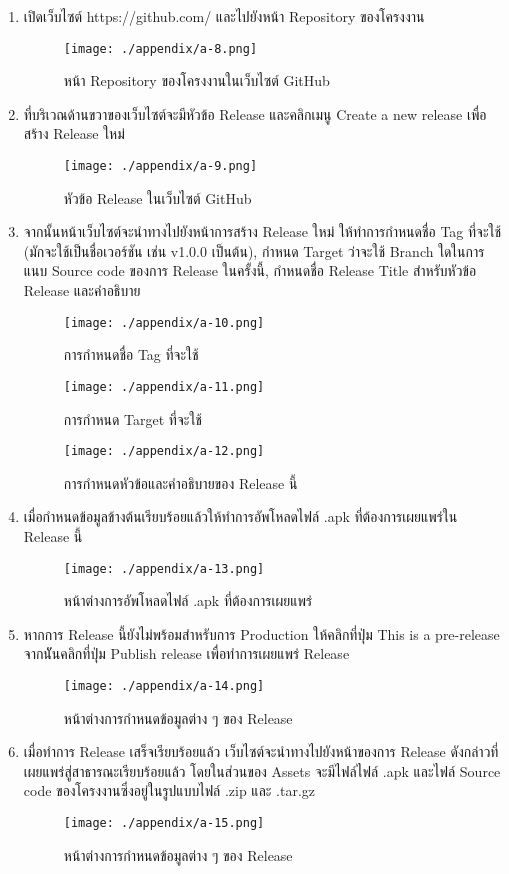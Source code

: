 \begin{enumerate}
    \item เปิดเว็บไซต์ https://github.com/ และไปยังหน้า Repository ของโครงงาน
    \begin{figure}
        \texttt{[image: ./appendix/a-8.png]}
        \caption{หน้า Repository ของโครงงานในเว็บไซต์ GitHub}
    \end{figure}
    \item ที่บริเวณด้านขวาของเว็บไซต์จะมีหัวข้อ Release และคลิกเมนู Create a new release เพื่อสร้าง Release ใหม่
    \begin{figure}
        \texttt{[image: ./appendix/a-9.png]}
        \caption{หัวข้อ Release ในเว็บไซต์ GitHub}
    \end{figure}
    \item จากนั้นหน้าเว็บไซต์จะนำทางไปยังหน้าการสร้าง Release ใหม่ ให้ทำการกำหนดชื่อ Tag ที่จะใช้ (มักจะใช้เป็นชื่อเวอร์ชัน เช่น v1.0.0 เป็นต้น), กำหนด Target ว่าจะใช้ Branch ใดในการแนบ Source code ของการ Release ในครั้งนี้, กำหนดชื่อ Release Title สำหรับหัวข้อ Release และคำอธิบาย
    \begin{figure}
        \texttt{[image: ./appendix/a-10.png]}
        \caption{การกำหนดชื่อ Tag ที่จะใช้}
    \end{figure}
    \begin{figure}
        \texttt{[image: ./appendix/a-11.png]}
        \caption{การกำหนด Target ที่จะใช้}
    \end{figure}
    \begin{figure}
        \texttt{[image: ./appendix/a-12.png]}
        \caption{การกำหนดหัวข้อและคำอธิบายของ Release นี้}
    \end{figure}
    \item เมื่อกำหนดข้อมูลข้างต้นเรียบร้อยแล้วให้ทำการอัพโหลดไฟล์ .apk ที่ต้องการเผยแพร่ใน Release นี้
    \begin{figure}
        \texttt{[image: ./appendix/a-13.png]}
        \caption{หน้าต่างการอัพโหลดไฟล์ .apk ที่ต้องการเผยแพร่}
    \end{figure}
    \item หากการ Release นี้ยังไม่พร้อมสำหรับการ Production ให้คลิกที่ปุ่ม This is a pre-release จากนัันคลิกที่ปุ่ม Publish release เพื่อทำการเผยแพร่ Release
    \begin{figure}
        \texttt{[image: ./appendix/a-14.png]}
        \caption{หน้าต่างการกำหนดข้อมูลต่าง ๆ ของ Release}
    \end{figure}
    \item เมื่อทำการ Release เสร็จเรียบร้อยแล้ว เว็บไซต์จะนำทางไปยังหน้าของการ Release ดังกล่าวที่เผยแพร่สู่สาธารณะเรียบร้อยแล้ว โดยในส่วนของ Assets จะมีไฟล์ไฟล์ .apk และไฟล์ Source code ของโครงงานซึ่งอยู่ในรูปแบบไฟล์ .zip และ .tar.gz
    \begin{figure}
        \texttt{[image: ./appendix/a-15.png]}
        \caption{หน้าต่างการกำหนดข้อมูลต่าง ๆ ของ Release}
    \end{figure}
\end{enumerate}

